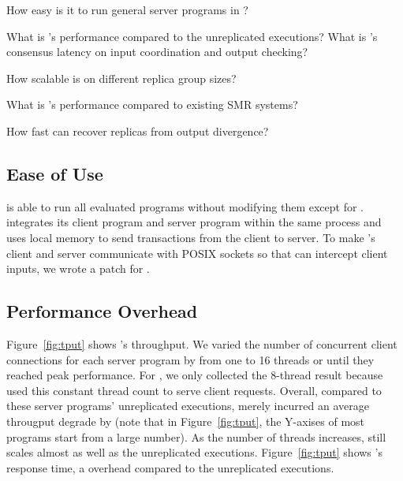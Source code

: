 \begin{tightenum}

\item[\S\ref{sec:ease-of-use}:] How easy is it to run general server programs 
in \xxx?

\item[\S\ref{sec:overhead}:] What is \xxx's performance compared to the 
unreplicated executions? What is \xxx's consensus latency on input coordination 
and output checking?

\item[\S\ref{sec:scalability}:] How scalable is \xxx on different replica group 
sizes?

\item[\S\ref{sec:compare}:] What is \xxx's performance compared to existing 
SMR systems?

\item[\S\ref{sec:robust}:] How fast can \xxx recover replicas from output 
divergence?



\end{tightenum}

\subsection{Ease of Use} \label{sec:ease-of-use}

\xxx is able to run all \nprog evaluated programs without modifying them except 
for \calvin. \calvin integrates its client program and server program within the 
same process and uses local memory to send transactions from the client to 
server. To make \calvin's client and server communicate with POSIX sockets so 
that \xxx can intercept client inputs, we wrote a \nlinescalvin patch for 
\calvin.

\subsection{Performance Overhead} \label{sec:overhead}

Figure~\ref{fig:tput} shows \xxx's throughput. We varied the number of 
concurrent client connections for each server program by from one to 16 threads 
or until they reached peak performance. For \calvin, we only collected the 
8-thread result because \calvin used this constant thread count to serve 
client requests. Overall, compared to these server programs' unreplicated 
executions, \xxx merely incurred an average througput degrade by \tputoverhead 
(note that in Figure~\ref{fig:tput}, the Y-axises of most programs start from a 
large number). As the number of threads increases, \xxx still scales almost as 
well as the unreplicated executions. Figure~\ref{fig:tput} shows 
\xxx's response time, a \latencyoverhead overhead compared to the unreplicated 
executions.

